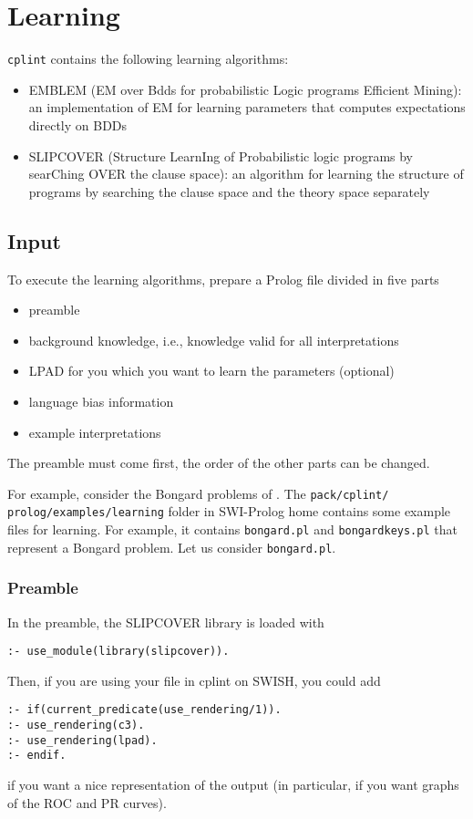 \documentclass[a4paper,10pt]{article}
\begin{document}
\section{Learning}
\texttt{cplint} contains the following learning algorithms:
\begin{itemize}
\item EMBLEM (EM over Bdds for probabilistic Logic programs Efficient Mining): an implementation of EM for learning parameters that computes expectations directly on BDDs \cite{BelRig11-IDA,BelRig11-CILC11-NC,BelRig11-TR}
\item SLIPCOVER (Structure LearnIng of Probabilistic logic programs by searChing OVER the clause space): an algorithm for learning the structure of programs by searching the clause space and the theory space separately \cite{BelRig13-TPLP-IJ}
\end{itemize}

\subsection{Input}
To execute the learning algorithms, prepare a Prolog file divided in five parts
\begin{itemize}
\item preamble
\item  background knowledge, i.e., knowledge valid for all interpretations
\item  LPAD for you which you want to learn the parameters (optional)
\item language bias information
\item  example interpretations 
\end{itemize}
The preamble must come first, the order of the other parts can be changed.

For example, consider the Bongard problems of \cite{RaeLae95-ALT95}. 
The \texttt{pack/cplint/ prolog/examples/learning} folder in SWI-Prolog home contains some example files for learning. 
For example, it contains \verb|bongard.pl| and \verb|bongardkeys.pl| that represent a Bongard problem.
Let us consider \verb|bongard.pl|.

\subsubsection{Preamble}
In the preamble, the SLIPCOVER library is loaded with
\begin{verbatim}
:- use_module(library(slipcover)).
\end{verbatim}
Then, if you are using your file in cplint on SWISH, you could add
\begin{verbatim}
:- if(current_predicate(use_rendering/1)).
:- use_rendering(c3).
:- use_rendering(lpad).
:- endif.
\end{verbatim}
if you want a nice representation of the output (in particular, if you want graphs of the ROC and PR curves).
\end{document}
